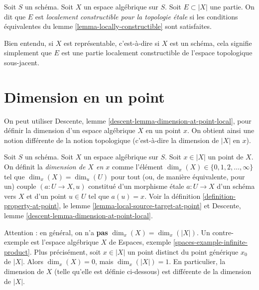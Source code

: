 \begin{definition}
\label{definition-locally-constructible}
Soit $S$ un schéma. Soit $X$ un espace algébrique sur $S$.
Soit $E \subset |X|$ une partie. On dit que $E$ est
{\it localement constructible pour la topologie \'etale} si les conditions
équivalentes du lemme \ref{lemma-locally-constructible} sont satisfaites.
\end{definition}

\noindent
Bien entendu, si $X$ est représentable, c'est-à-dire si $X$ est un schéma,
cela signifie simplement que $E$ est une partie localement constructible
de l'espace topologique sous-jacent.







\section{Dimension en un point}
\label{section-dimension}

\noindent
On peut utiliser
Descente, lemme \ref{descent-lemma-dimension-at-point-local},
pour définir la dimension d'un espace
algébrique $X$ en un point $x$. On obtient ainsi une notion différente de la
notion topologique (c'est-à-dire la dimension de $|X|$ en $x$).

\begin{definition}
\label{definition-dimension-at-point}
Soit $S$ un schéma.
Soit $X$ un espace algébrique sur $S$.
Soit $x \in |X|$ un point de $X$.
On définit la {\it dimension de $X$ en $x$} comme
l'élément $\dim_x(X) \in \{0, 1, 2, \ldots, \infty\}$
tel que $\dim_x(X) = \dim_u(U)$ pour tout (ou, de manière équivalente, pour un)
couple $(a : U \to X, u)$ constitué d'un morphisme \'etale $a : U \to X$
d'un schéma vers $X$ et d'un point $u \in U$ tel que $a(u) = x$.
Voir la
définition \ref{definition-property-at-point}, le
lemme \ref{lemma-local-source-target-at-point} et
Descente, lemme \ref{descent-lemma-dimension-at-point-local}.
\end{definition}

\noindent
Attention : en général, on n'a {\bf pas} $\dim_x(X) = \dim_x(|X|)$.
Un contre-exemple est l'espace algébrique $X$ de
Espaces, exemple \ref{spaces-example-infinite-product}.
Plus précisément, soit $x \in |X|$ un point distinct du point générique $x_0$
de $|X|$. Alors $\dim_x(X) = 0$, mais $\dim_x(|X|) = 1$.
En particulier, la dimension de $X$ (telle qu'elle est définie
ci-dessous) est différente de la dimension de $|X|$.

